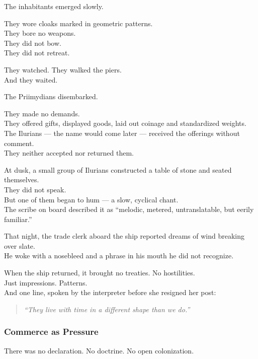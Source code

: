 \documentclass[12pt]{article}
\begin{document}
The inhabitants emerged slowly.

They wore cloaks marked in geometric patterns.\\
They bore no weapons.\\
They did not bow.\\
They did not retreat.

They watched. They walked the piers.\\
And they waited.

\vspace{1em}

The Priimydians disembarked.

They made no demands.\\
They offered gifts, displayed goods, laid out coinage and standardized weights.\\
The Ilurians --- the name would come later --- received the offerings without comment.\\
They neither accepted nor returned them.

At dusk, a small group of Ilurians constructed a table of stone and seated themselves.\\
They did not speak.\\
But one of them began to hum --- a slow, cyclical chant.\\
The scribe on board described it as ``melodic, metered, untranslatable, but eerily familiar.”

That night, the trade clerk aboard the ship reported dreams of wind breaking over slate.\\
He woke with a nosebleed and a phrase in his mouth he did not recognize.

\vspace{1em}

When the ship returned, it brought no treaties. No hostilities.\\
Just impressions. Patterns.\\
And one line, spoken by the interpreter before she resigned her post:

\begin{quote}
\textit{“They live with time in a different shape than we do.”}
\end{quote}

\dotfill

\subsubsection*{Commerce as Pressure}

There was no declaration. No doctrine. No open colonization.
\end{document}
